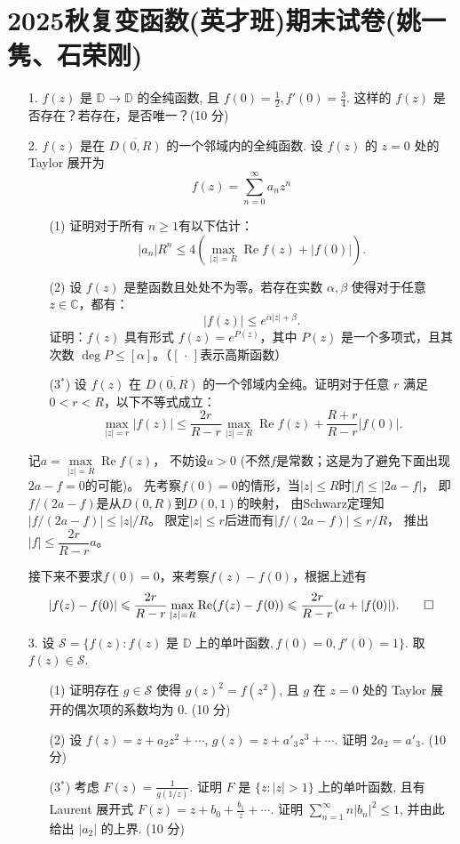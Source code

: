 \section{2025秋复变函数(英才班)期末试卷(姚一隽、石荣刚)}
\begin{enumerate}
\item[1.] $f(z)$ 是 $\mathbb{D} \to \mathbb{D}$ 的全纯函数, 且 $f(0) = \frac{1}{2}, f'(0) = \frac{3}{4}$. 这样的 $f(z)$ 是否存在？若存在，是否唯一？(10 分)

\item[2.] $f(z)$ 是在 $\overline{D(0, R)}$ 的一个邻域内的全纯函数. 设 $f(z)$ 的 $z = 0$ 处的 Taylor 展开为 \[
   f(z) = \sum_{n=0}^\infty a_n z^n
\]
\begin{itemize}
    \item[(1)] 证明对于所有 $n \ge 1$有以下估计：
    \[|a_n| R^n \le 4 \left( \max_{|z|=R} \operatorname{Re} f(z) + |f(0)| \right).\]
    \item[(2)] 设 $f(z)$ 是整函数且处处不为零。若存在实数 $\alpha, \beta$ 使得对于任意 $z \in \mathbb{C}$，都有：
    \[|f(z)| \le e^{\alpha|z| + \beta}.\]
    证明：$f(z)$ 具有形式 $f(z) = e^{P(z)}$，其中 $P(z)$ 是一个多项式，且其次数 $\deg P \le [\alpha]$。（$[\,\cdot\,]$表示高斯函数）
    \item[(3$^*$)] 设 $f(z)$ 在 $\overline{D(0,R)}$ 的一个邻域内全纯。证明对于任意 $r$ 满足 $0 < r < R$，以下不等式成立：
    \[\max_{|z|=r} |f(z)| \le \frac{2r}{R-r} \max_{|z|=R} \operatorname{Re} f(z) + \frac{R+r}{R-r} |f(0)|.\]
\end{itemize}
\begin{proofc}[(3) 的解答]
    记$a=\max\limits_{|z|=R}\operatorname{Re}f(z)$，
    不妨设$a>0$ (不然$f$是常数；这是为了避免下面出现$2a-f=0$的可能)。
    先考察$f(0)=0$的情形，当$|z| \leqslant R$时$|f|\leqslant|2a-f|$，
    即$f/(2a-f)$是从$D(0,R)$到$D(0,1)$的映射，
    由Schwarz定理知$|f/(2a-f)|\leqslant|z|/R$。
    限定$|z| \leqslant r$后进而有$|f/(2a-f)| \leqslant r/R$，
    推出$|f|\leqslant\dfrac{2r}{R-r}a$。
    
    接下来不要求$f(0)=0$，来考察$f(z)-f(0)$，根据上述有
    \[|f(z)-f(0)|\leqslant\frac{2r}{R-r}\max_{|z|=R}\operatorname{Re}(f(z)-f(0))
    \leqslant\frac{2r}{R-r}(a+|f(0)|).\qedhere\]
\end{proofc}

\item[3.] 设 $\mathcal{S} = \{ f(z) : f(z) \text{ 是 $\mathbb{D}$ 上的单叶函数}, f(0) = 0, f'(0) = 1 \}$. 取 $f(z) \in \mathcal{S}$.
\begin{itemize}
    \item[(1)] 证明存在 $g \in \mathcal{S}$ 使得 $g(z)^2 = f(z^2)$, 且 $g$ 在 $z = 0$ 处的 Taylor 展开的偶次项的系数均为 $0$. (10 分)
    \item[(2)] 设 $f(z) = z + a_2 z^2 + \cdots$, $g(z) = z + a'_3 z^3 + \cdots$. 证明 $2 a_2 = a'_3$. (10 分)
    \item[(3$^*$)] 考虑 $F(z) = \frac{1}{g(1 / z)}$. 证明 $F$ 是 $\{ z : |z| > 1 \}$ 上的单叶函数, 
    且有 Laurent 展开式 $F(z) = z + b_0 + \frac{b_1}{z} + \cdots$.
    证明 $\sum \limits_{n=1}^\infty n |b_n|^2 \leq 1$, 并由此给出 $|a_2|$ 的上界. (10 分)
\end{itemize}


\end{enumerate}
